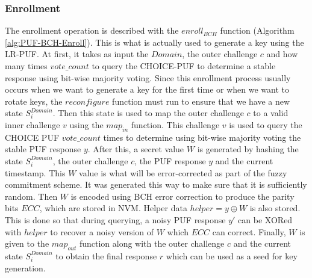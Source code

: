 \subsubsection{Enrollment}
The enrollment operation is described with the $enroll_{BCH}$ function (Algorithm \ref{alg:PUF-BCH-Enroll}). This is what is actually used to generate a key using the LR-PUF. At first, it takes as input the $Domain$, the outer challenge $c$ and how many times $vote\_count$ to query the CHOICE-PUF to determine a stable response using bit-wise majority voting. Since this enrollment process usually occurs when we want to generate a key for the first time or when we want to rotate keys, the $reconfigure$ function must run to ensure that we have a new state $S_i^{Domain}$. Then this state is used to map the outer challenge $c$ to a valid inner challenge $v$ using the $map_{in}$ function. This challenge $v$ is used to query the CHOICE PUF $vote\_count$ times to determine using bit-wise majority voting the stable PUF response $y$. After this, a secret value $W$ is generated by hashing the state $S_i^{Domain}$, the outer challenge $c$, the PUF response $y$ and the current timestamp. This $W$ value is what will be error-corrected as part of the fuzzy commitment scheme. It was generated this way to make sure that it is sufficiently random. Then $W$ is encoded using BCH error correction to produce the parity bits $ECC$, which are stored in NVM. Helper data $helper = y \oplus W$ is also stored. This is done so that during querying, a noisy PUF response $y'$ can be XORed with $helper$ to recover a noisy version of $W$ which $ECC$ can correct. Finally, $W$ is given to the $map_{out}$ function along with the outer challenge $c$ and the current state $S_i^{Domain}$ to obtain the final response $r$ which can be used as a seed for key generation.

